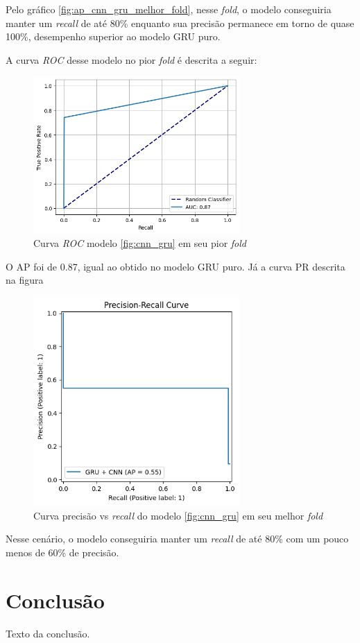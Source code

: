 \documentclass[
    12pt,                %
    openright,           %
    oneside,             %
    a4paper,             %
    brazil               %
]{abntex2}
\begin{document}
Pelo gráfico \ref{fig:ap_cnn_gru_melhor_fold}, nesse \textit{fold}, o modelo conseguiria manter um \textit{recall} de até 80\%
enquanto sua precisão permanece em torno de quase 100\%, desempenho superior ao modelo GRU puro.

A curva \textit{ROC} desse modelo no pior \textit{fold} é descrita a seguir:

\begin{figure}[H]
  \centering
   \includegraphics[width=0.7\textwidth]{figuras/modelos_resultados/gru_cnn/roc_cnn_pior_fold_3.png} 
  \caption{Curva \textit{ROC} modelo \ref{fig:cnn_gru} em seu pior \textit{fold}}
  \label{fig:roc_cnn_gru_pior_fold}
\end{figure}

O AP foi de 0.87, igual ao obtido no modelo GRU puro. Já a curva PR descrita na figura

\begin{figure}[H]
  \centering
   \includegraphics[width=0.7\textwidth]{figuras/modelos_resultados/gru_cnn/ap_gru_cnn_pior_fold_3.png} 
  \caption{Curva precisão vs \textit{recall} do modelo \ref{fig:cnn_gru} em seu melhor \textit{fold}}
  \label{fig:ap_cnn_gru_pior_fold}
\end{figure}

Nesse cenário, o modelo conseguiria manter um \textit{recall} de até 80\% com um pouco menos de 60\% de precisão.

\chapter{Conclusão}

Texto da conclusão.



\end{document}
